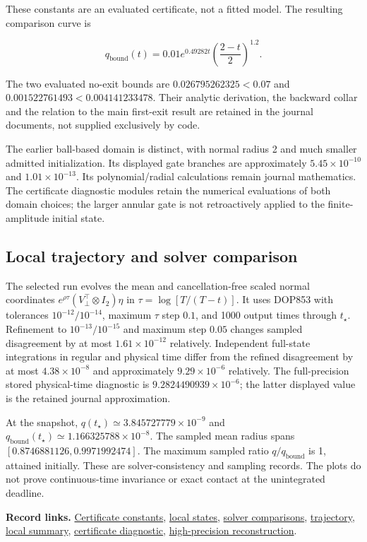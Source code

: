\documentclass[11pt,a4paper]{article}
\begin{document}
These constants are an evaluated certificate, not a fitted model. The
resulting comparison curve is

\[
q_{\mathrm{bound}}(t)=0.01e^{0.49282t}\left(\frac{2-t}{2}\right)^{1.2}.
\]

The two evaluated no-exit bounds are \(0.026795262325<0.07\) and
\(0.001522761493<0.004141233478\). Their analytic derivation, the
backward collar and the relation to the main first-exit result are
retained in the journal documents, not supplied exclusively by code.

The earlier ball-based domain is distinct, with normal radius 2 and much
smaller admitted initialization. Its displayed gate branches are
approximately \(5.45\times10^{-10}\) and \(1.01\times10^{-13}\). Its
polynomial/radial calculations remain journal mathematics. The
certificate diagnostic modules retain the numerical evaluations of both
domain choices; the larger annular gate is not retroactively applied to
the finite-amplitude initial state.

\subsection{Local trajectory and solver
comparison}\label{c08-trajectory}

The selected run evolves the mean and cancellation-free scaled normal
coordinates \(e^{\rho\tau}(V_\perp^\top\otimes I_2)\eta\) in
\(\tau=\log[T/(T-t)]\). It uses DOP853 with tolerances
\(10^{-12}/10^{-14}\), maximum \(\tau\) step \(0.1\), and 1000 output
times through \(t_\star\). Refinement to \(10^{-13}/10^{-15}\) and
maximum step \(0.05\) changes sampled disagreement by at most
\(1.61\times10^{-12}\) relatively. Independent full-state integrations
in regular and physical time differ from the refined disagreement by at
most \(4.38\times10^{-8}\) and approximately \(9.29\times10^{-6}\)
relatively. The full-precision stored physical-time diagnostic is
\(9.2824490939\times10^{-6}\); the latter displayed value is the
retained journal approximation.

At the snapshot, \(q(t_\star)\simeq3.845727779\times10^{-9}\) and
\(q_{\mathrm{bound}}(t_\star)\simeq1.166325788\times10^{-8}\). The
sampled mean radius spans \([0.8746881126,0.9971992474]\). The maximum
sampled ratio \(q/q_{\mathrm{bound}}\) is 1, attained initially. These
are solver-consistency and sampling records. The plots do not prove
continuous-time invariance or exact contact at the unintegrated
deadline.

\textbf{Record links.}
\href{../data/records/local_certificate.json}{Certificate constants},
\href{../data/records/local_initial_states.csv}{local states},
\href{../data/records/local_solver_comparison.csv}{solver comparisons},
\href{../data/records/local_trajectory.csv}{trajectory},
\href{../data/records/local_summary.json}{local summary},
\href{../code/benchmark_certificate.py}{certificate diagnostic},
\href{../code/certificate_reconstruction.py}{high-precision
reconstruction}.
\end{document}
